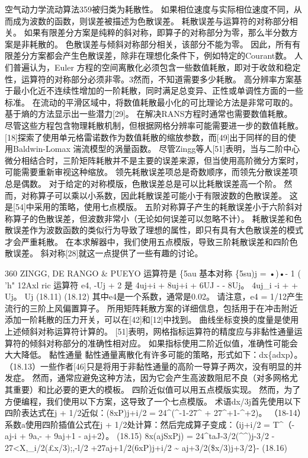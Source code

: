 \documentclass[UTF8,11pt,a4paper,openany,fontset=fandol]{ctexbook}
\begin{document}
空气动力学流动算法359被归类为耗散性。 如果相位速度与实际相位速度不同，从而成为波数的函数，则误差被描述为色散误差。 耗散误差与运算符的对称部分相关。 如果有限差分方案是纯粹的斜对称，即算子的对称部分为零，那么半分数方案是非耗散的。 色散误差与倾斜对称部分相关，该部分不能为零。 因此，所有有限差分方案都会产生色散误差，除非在理想化条件下，例如特定的Courant数。 人们普遍认为，Euler 方程的空间离散化必须包含一些数值耗散，即对于收敛和稳定性，运算符的对称部分必须非零。3然而，不知道需要多少耗散。 高分辨率方案基于最小化近不连续性增加的一阶耗散，同时满足总变异、正性或单调性方面的一些标准。 在流动的平滑区域中，将数值耗散最小化的可比理论方法是非常可取的。 基于熵的方法显示出一些潜力[29]。 在解决RANS方程时通常也需要数值耗散。 尽管这些方程包含物理耗散机制，但根据网格分辨率可能需要进一步的数值耗散。[18]探索了使用单元格雷诺数作为数值耗散的缩放参数，而[49]出于同样的目的使用Baldwin-Lomax 湍流模型的涡量函数。 尽管Zingg等人[51]表明，当与二阶中心微分相结合时，三阶矩阵耗散并不是主要的误差来源，但当使用高阶微分方案时，可能需要重新审视这种缩放。 领先耗散误差项总是奇数顺序，而领先分散误差项总是偶数。 对于给定的对称模版，色散误差总是可以比耗散误差高一个阶。 然而，对称算子可以乘以小系数，因此耗散误差可能小于有限波数的色散误差。 这是[54]中采用的策略，使用七点模版。 五阶对称算子产生的耗散误差小于六阶斜对称算子的色散误差，但波数非常小（无论如何误差可以忽略不计）。 耗散误差和色散误差作为波数函数的类似行为导致了理想的属性，即只有具有大色散误差的模式才会严重耗散。 在本求解器中，我们使用五点模版，导致三阶耗散误差和四阶色散误差。 斜对称[28]就这一点提供了一些有趣的讨论。

360 ZINGG, DE RANGO \& PUEYO 运算符是 \{5au 基本对称 \{5su)j = •)•- 1 ( 'h" 12Axl ric 运算符 e4, -Uj + 2 是 4uj+i + 8uj+i + 6UJ - - 8Uj。 4uj\_i -i + + Uj。 Uj (18.11) (18.12) 其中e4是一个系数，通常是0.02。 请注意，e4 = 1/12产生流行的三阶上风偏置算子。 所用矩阵耗散方案的详细信息，包括用于在冲击附近添加一阶耗散的压力开关，可以在[42]和[12]中找到。 曲线坐标变换的度量是使用上述倾斜对称运算符计算的。 [51]表明，网格指标运算符的精度应与非黏性通量运算符的倾斜对称部分的准确性相对应。 如果指标使用二阶近似值，准确性可能会大大降低。 黏性通量 黏性通量离散化有许多可能的策略，形式如下：dx\{adxp）。 （18.13）一些作者[46]只是将用于非黏性通量的高阶一导算子两次，没有明显的并发症。 然而，通常应避免这种方法，因为它会产生高波数阻尼不良（对多网格尤其重要）和比必要的更大的模板。 四阶近似值可以用五点模版实现。 然而，为了方便编程，我们使用以下方案，这导致了一个七点模版。 术语dx/3j首先使用以下四阶表达式在j + 1/2近似：(8xP)j+i/2 = 24\textasciicircum{}(\textasciicircum{}-1-27\textasciicircum{} + 27\textasciicircum{}+1-\textasciicircum{}+2)。 （18-14）系数a使用四阶插值公式在j + 1/2处计算：然后完成算子变成：（ij+i/2 = T\textasciicircum{}（-aj-i + 9a,- + 9aj+1 - aj+2）。 (18.15) 8x(ajSxPj) = 24\textasciicircum{}taJ-3/2(\textasciicircum{}\textasciicircum{})j-3/2 - 27<X,\_i/2(£x/3);,-l/2 +27aj+1/2(6xP)j+i/2 \textasciitilde{} aj+3/2(\$x/3)j+3/2\}- (18.16)
\end{document}
